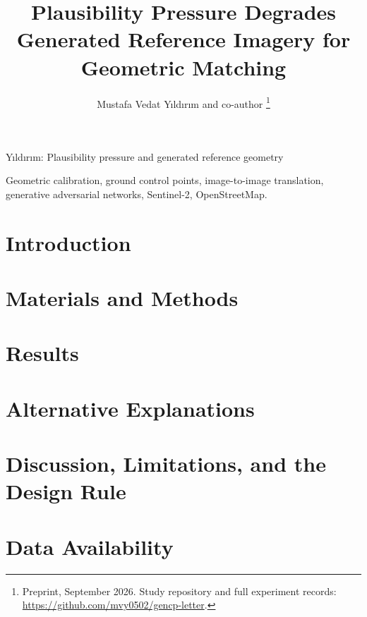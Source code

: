 \documentclass[journal]{IEEEtran}
\begin{document}
\title{Plausibility Pressure Degrades Generated Reference Imagery
for Geometric Matching}

\author{Mustafa Vedat Y\i ld\i r\i m and co-author%
\thanks{Preprint, September 2026. Study repository and full experiment records:
\url{https://github.com/mvy0502/gencp-letter}.}}

%
{Y\i ld\i r\i m: Plausibility pressure and generated reference geometry}

\maketitle

\begin{abstract}

\end{abstract}

\begin{IEEEkeywords}
Geometric calibration, ground control points, image-to-image translation,
generative adversarial networks, Sentinel-2, OpenStreetMap.
\end{IEEEkeywords}

\section{Introduction}


\section{Materials and Methods}


\section{Results}


\section{Alternative Explanations}


\section{Discussion, Limitations, and the Design Rule}


\section*{Data Availability}




\end{document}
